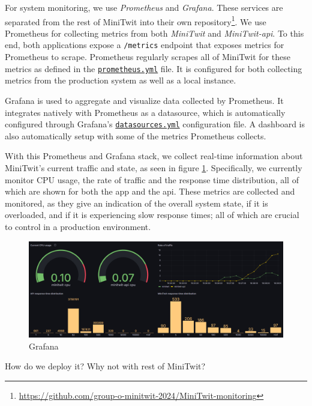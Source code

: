 \documentclass[11pt]{article}
\begin{document}
For system monitoring, we use \textit{Prometheus} and \textit{Grafana}. These services are separated from the rest of MiniTwit into their own repository\footnote{\url{https://github.com/group-o-minitwit-2024/MiniTwit-monitoring}}. We use Prometheus for collecting metrics from both \textit{MiniTwit} and \textit{MiniTwit-api}. To this end, both applications expose a \texttt{/metrics} endpoint that exposes metrics for Prometheus to scrape. Prometheus regularly scrapes all of MiniTwit for these metrics as defined in the \href{https://github.com/group-o-minitwit-2024/MiniTwit-monitoring/blob/main/prometheus/prometheus.yml}{\texttt{prometheus.yml}} file. It is configured for both collecting metrics from the production system as well as a local instance. 

Grafana is used to aggregate and visualize data collected by Prometheus. It integrates natively with Prometheus as a datasource, which is automatically configured through Grafana's \href{https://github.com/group-o-minitwit-2024/MiniTwit-monitoring/blob/main/grafana/provisioning/datasources/datasources.yaml}{\texttt{datasources.yml}} configuration file. A dashboard is also automatically setup with some of the metrics Prometheus collects. 

With this Prometheus and Grafana stack, we collect real-time information about MiniTwit's current traffic and state, as seen in figure \ref{fig:grafana}. Specifically, we currently monitor CPU usage, the rate of traffic and the response time distribution, all of which are shown for both the app and the api. These metrics are collected and monitored, as they give an indication of the overall system state, if it is overloaded, and if it is experiencing slow response times; all of which are crucial to control in a production environment. 

\begin{figure}[h]
    \centering
    \includegraphics[width=0.75\linewidth]{images/grafana.png}
    \caption{Grafana}
    \label{fig:grafana}
\end{figure}

How do we deploy it?
    Why not with rest of MiniTwit?
\end{document}
